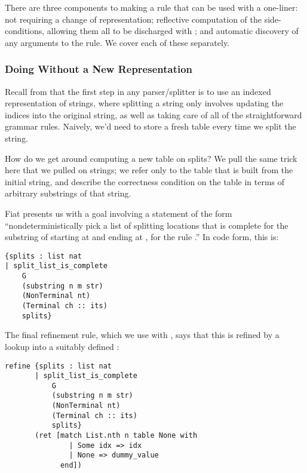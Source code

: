     There are three components to making a rule that can be used with a one-liner: not requiring a change of representation; reflective computation of the side-conditions, allowing them all to be discharged with \tacREFLEXIVITY; and automatic discovery of any arguments to the rule.  We cover each of these separately.
    
    \subsubsection{Doing Without a New Representation}
      Recall from  that the first step in any parser/splitter  is to use an indexed representation of strings, where splitting a string only involves updating the indices into the original string, as well as taking care of all of the straightforward grammar rules.  Naively, we'd need to store a fresh table every time we split the string.
      
      How do we get around computing a new table on splits?  We pull the same trick here that we pulled on strings; we refer only to the table that is built from the initial string, and describe the correctness condition on the table in terms of arbitrary substrings of that string.
      
      Fiat presents us with a goal involving a statement of the form ``nondeterministically pick a list of splitting locations that is complete for the substring of  starting at  and ending at , for the rule .''  In code form, this is:
\begin{verbatim}
{splits : list nat
| split_list_is_complete
    G
    (substring n m str)
    (NonTerminal nt)
    (Terminal ch :: its)
    splits}
\end{verbatim}
    
    The final refinement rule, which we use with , says that this is refined by a lookup into a suitably defined :
\begin{verbatim}
refine {splits : list nat
       | split_list_is_complete
           G
           (substring n m str)
           (NonTerminal nt)
           (Terminal ch :: its)
           splits}
       (ret [match List.nth n table None with
               | Some idx => idx
               | None => dummy_value
             end])
\end{verbatim}

